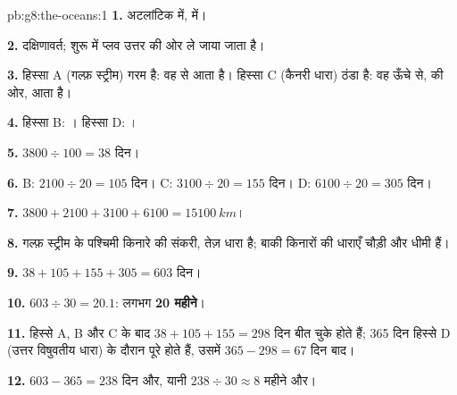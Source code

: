 \begin{solution}{pb:g8:the-oceans:1}
\textbf{1.} अटलांटिक  में,  में।

\textbf{2.} दक्षिणावर्त; शुरू में प्लव उत्तर की ओर ले जाया जाता है।

\textbf{3.} हिस्सा A (गल्फ़ स्ट्रीम) गरम है: वह  से आता है। हिस्सा C
(कैनरी धारा) ठंडा है: वह ऊँचे  से,  की ओर,
आता है।

\textbf{4.} हिस्सा B: । हिस्सा D: ।

\textbf{5.} $3800 \div 100 = 38$ दिन।

\textbf{6.} B: $2100 \div 20 = 105$ दिन। C: $3100 \div 20 = 155$ दिन।
D: $6100 \div 20 = 305$ दिन।

\textbf{7.} $3800 + 2100 + 3100 + 6100 = \qty{15100}{km}$।

\textbf{8.} गल्फ़ स्ट्रीम  के पश्चिमी किनारे की संकरी, तेज़ धारा है; बाकी किनारों
की धाराएँ चौड़ी और धीमी हैं।

\textbf{9.} $38 + 105 + 155 + 305 = 603$ दिन।

\textbf{10.} $603 \div 30 = 20.1$: लगभग \textbf{20 महीने}।

\textbf{11.} हिस्से A, B और C के बाद $38 + 105 + 155 = 298$ दिन बीत चुके होते हैं;
365 दिन हिस्से D (उत्तर विषुवतीय धारा) के दौरान पूरे होते हैं, उसमें
$365 -
298 = 67$ दिन बाद।

\textbf{12.} $603 - 365 = 238$ दिन और, यानी $238 \div 30 \approx 8$ महीने
और।
\end{solution}
